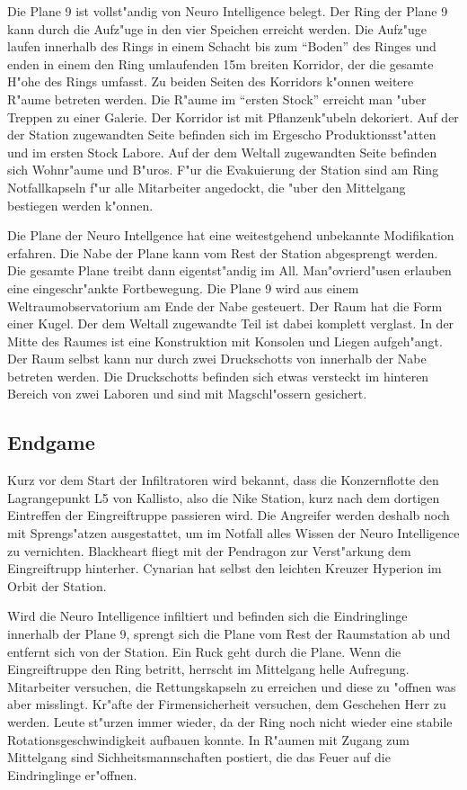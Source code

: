 Die Plane 9 ist vollst"andig von Neuro Intelligence belegt. Der Ring der Plane 9 kann durch die Aufz"uge in den vier Speichen erreicht werden. Die Aufz"uge laufen innerhalb des Rings in einem Schacht bis zum "`Boden"' des Ringes und enden in einem den Ring umlaufenden 15m breiten Korridor, der die gesamte H"ohe des Rings umfasst. Zu beiden Seiten des Korridors k"onnen weitere R"aume betreten werden. Die R"aume im "`ersten Stock"' erreicht man "uber Treppen zu einer Galerie. Der Korridor ist mit Pflanzenk"ubeln dekoriert. Auf der der Station zugewandten Seite befinden sich im Ergescho\3 Produktionsst"atten und im ersten Stock Labore. Auf der dem Weltall zugewandten Seite befinden sich Wohnr"aume und B"uros. F"ur die Evakuierung der Station sind am Ring Notfallkapseln f"ur alle Mitarbeiter angedockt, die "uber den Mittelgang bestiegen werden k"onnen.

Die Plane der Neuro Intellgence hat eine weitestgehend unbekannte Modifikation erfahren. Die Nabe der Plane kann vom Rest der Station abgesprengt werden. Die gesamte Plane treibt dann eigentst"andig im All. Man"ovrierd"usen erlauben eine eingeschr"ankte Fortbewegung. Die Plane 9 wird aus einem Weltraumobservatorium am Ende der Nabe gesteuert. Der Raum hat die Form einer Kugel. Der dem Weltall zugewandte Teil ist dabei komplett verglast. In der Mitte des Raumes ist eine Konstruktion mit Konsolen und Liegen aufgeh"angt. Der Raum selbst kann nur durch zwei Druckschotts von innerhalb der Nabe betreten werden. Die Druckschotts befinden sich etwas versteckt im hinteren Bereich von zwei Laboren und sind mit Magschl"ossern gesichert.

\subsection{Endgame}

Kurz vor dem Start der Infiltratoren wird bekannt, dass die Konzernflotte den Lagrangepunkt L5 von Kallisto, also die Nike Station, kurz nach dem dortigen Eintreffen der Eingreiftruppe passieren wird. Die Angreifer werden deshalb noch mit Sprengs"atzen ausgestattet, um im Notfall alles Wissen der Neuro Intelligence zu vernichten. Blackheart fliegt mit der Pendragon zur Verst"arkung dem Eingreiftrupp hinterher. Cynarian hat selbst den leichten Kreuzer Hyperion im Orbit der Station.

Wird die Neuro Intelligence infiltiert und befinden sich die Eindringlinge innerhalb der Plane 9, sprengt sich die Plane vom Rest der Raumstation ab und entfernt sich von der Station. Ein Ruck geht durch die Plane. Wenn die Eingreiftruppe den Ring betritt, herrscht im Mittelgang helle Aufregung. Mitarbeiter versuchen, die Rettungskapseln zu erreichen und diese zu "offnen was aber misslingt. Kr"afte der Firmensicherheit versuchen, dem Geschehen Herr zu werden. Leute st"urzen immer wieder, da der Ring noch nicht wieder eine stabile Rotationsgeschwindigkeit aufbauen konnte. In R"aumen mit Zugang zum Mittelgang sind Sichheitsmannschaften postiert, die das Feuer auf die Eindringlinge er"offnen.

